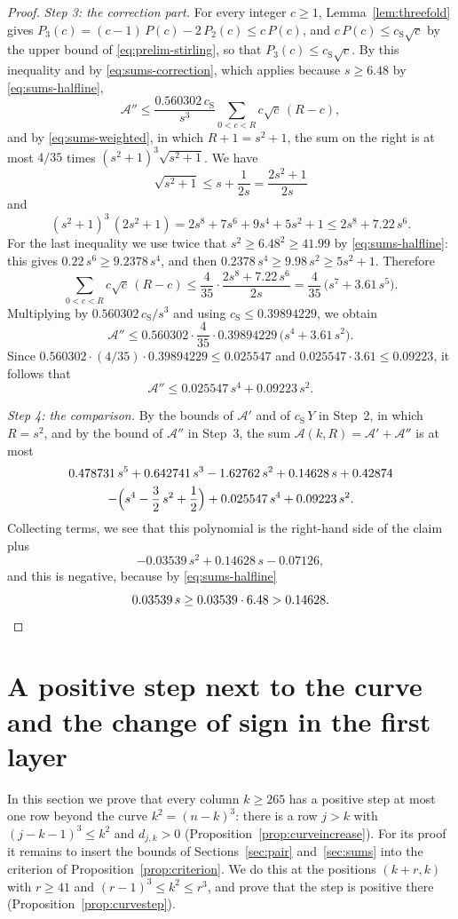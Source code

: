 \documentclass{amsart}
\theoremstyle{definition}
\theoremstyle{remark}
\numberwithin{equation}{section}
\begin{document}
\begin{proof}
\emph{Step 3: the correction part.}
For every integer $c\ge1$, Lemma~\ref{lem:threefold} gives
$P_3(c)=(c-1)\,P(c)-2\,P_2(c)\le c\,P(c)$, and
$c\,P(c)\le c_{\mathrm S}\sqrt c$ by the upper bound of
\eqref{eq:prelim-stirling}, so that $P_3(c)\le c_{\mathrm S}\sqrt c$. By this
inequality and by \eqref{eq:sums-correction}, which applies because
$s\ge6.48$ by \eqref{eq:sums-halfline},
\[
\mathcal A''\le\frac{0.560302\,c_{\mathrm S}}{s^3}
\sum_{0<c<R}c\sqrt c\,(R-c),
\]
and by \eqref{eq:sums-weighted}, in which $R+1=s^2+1$, the sum on the right
is at most $4/35$ times $(s^2+1)^3\sqrt{s^2+1}$. We have
\[
\sqrt{s^2+1}\le s+\frac1{2s}=\frac{2s^2+1}{2s}
\]
and
\[
(s^2+1)^3\,(2s^2+1)=2s^8+7s^6+9s^4+5s^2+1\le2s^8+7.22\,s^6 .
\]
For the last inequality we use twice that $s^2\ge6.48^2\ge41.99$ by
\eqref{eq:sums-halfline}: this gives $0.22\,s^6\ge9.2378\,s^4$, and then
$0.2378\,s^4\ge9.98\,s^2\ge5s^2+1$. Therefore
\[
\sum_{0<c<R}c\sqrt c\,(R-c)\le\frac4{35}\cdot\frac{2s^8+7.22\,s^6}{2s}
=\frac4{35}\,\bigl(s^7+3.61\,s^5\bigr).
\]
Multiplying by $0.560302\,c_{\mathrm S}/s^3$ and using
$c_{\mathrm S}\le0.39894229$, we obtain
\[
\mathcal A''
\le0.560302\cdot\frac4{35}\cdot0.39894229\,\bigl(s^4+3.61\,s^2\bigr).
\]
Since $0.560302\cdot(4/35)\cdot0.39894229\le0.025547$ and
$0.025547\cdot3.61\le0.09223$, it follows that
\[
\mathcal A''\le0.025547\,s^4+0.09223\,s^2 .
\]

\emph{Step 4: the comparison.}
By the bounds of $\mathcal A'$ and of $c_{\mathrm S}\,Y$ in Step~2, in
which $R=s^2$, and by the bound of $\mathcal A''$ in Step~3, the sum
$\mathcal A(k,R)=\mathcal A'+\mathcal A''$ is at most
\begin{multline*}
0.478731\,s^5+0.642741\,s^3-1.62762\,s^2+0.14628\,s+0.42874\\
-\Bigl(s^4-\frac32\,s^2+\frac12\Bigr)+0.025547\,s^4+0.09223\,s^2 .
\end{multline*}
Collecting terms, we see that this polynomial is the right-hand side of the
claim plus
\[
-0.03539\,s^2+0.14628\,s-0.07126 ,
\]
and this is negative, because by \eqref{eq:sums-halfline}
\[
0.03539\,s\ge0.03539\cdot6.48>0.14628 .\qedhere
\]
\end{proof}

\section{A positive step next to the curve and the change of sign in the first layer}\label{sec:curve}
In this section we prove that every column $k\ge265$ has a positive step
at most one row beyond the curve $k^2=(n-k)^3$: there is a row $j>k$ with
$(j-k-1)^3\le k^2$ and $d_{j,k}>0$
(Proposition~\ref{prop:curveincrease}). For
its proof it remains to insert the bounds of Sections~\ref{sec:pair}
and~\ref{sec:sums} into the criterion of Proposition~\ref{prop:criterion}.
We do this at the positions $(k+r,k)$ with $r\ge41$ and
$(r-1)^3\le k^2\le r^3$, and prove that the step is positive there
(Proposition~\ref{prop:curvestep}).
\end{document}
